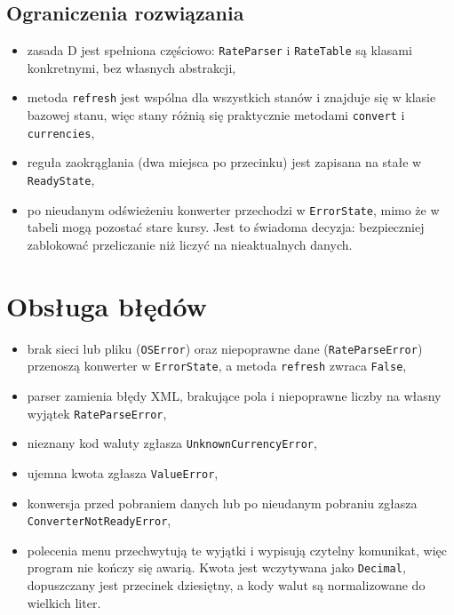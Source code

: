 \documentclass[12pt,a4paper]{article}
\begin{document}
\subsection*{Ograniczenia rozwiązania}

\begin{itemize}
    \item zasada D jest spełniona częściowo: \texttt{RateParser} i \texttt{RateTable} są klasami konkretnymi, bez własnych abstrakcji,
    \item metoda \texttt{refresh} jest wspólna dla wszystkich stanów i znajduje się w klasie bazowej stanu, więc stany różnią się praktycznie metodami \texttt{convert} i \texttt{currencies},
    \item reguła zaokrąglania (dwa miejsca po przecinku) jest zapisana na stałe w \texttt{ReadyState},
    \item po nieudanym odświeżeniu konwerter przechodzi w \texttt{ErrorState}, mimo że w tabeli mogą pozostać stare kursy. Jest to świadoma decyzja: bezpieczniej zablokować przeliczanie niż liczyć na nieaktualnych danych.
\end{itemize}

\section{Obsługa błędów}

\begin{itemize}
    \item brak sieci lub pliku (\texttt{OSError}) oraz niepoprawne dane (\texttt{RateParseError}) przenoszą konwerter w \texttt{ErrorState}, a metoda \texttt{refresh} zwraca \texttt{False},
    \item parser zamienia błędy XML, brakujące pola i niepoprawne liczby na własny wyjątek \texttt{RateParseError},
    \item nieznany kod waluty zgłasza \texttt{UnknownCurrencyError},
    \item ujemna kwota zgłasza \texttt{ValueError},
    \item konwersja przed pobraniem danych lub po nieudanym pobraniu zgłasza \texttt{ConverterNotReadyError},
    \item polecenia menu przechwytują te wyjątki i wypisują czytelny komunikat, więc program nie kończy się awarią. Kwota jest wczytywana jako \texttt{Decimal}, dopuszczany jest przecinek dziesiętny, a kody walut są normalizowane do wielkich liter.
\end{itemize}
\end{document}
